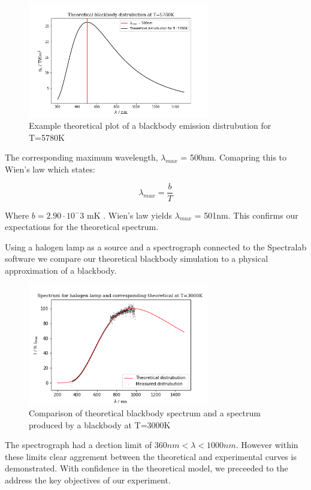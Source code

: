 \documentclass{article}%
\begin{document}
\begin{figure}[H]%
\centering%
\includegraphics[width=300px]{task1_fig_a.png}%
\caption{Example theoretical plot of a blackbody emission distrubution for T=5780K}%
\end{figure}


The corresponding maximum wavelength, $\lambda_{max}$ = 500nm. Comapring this to Wien's law which states: 

\begin{equation}
   \lambda_{max} = \frac{b}{T}
\end{equation}



Where $b=2.90 \cdot 10^-3$ mK . Wien's law yields $\lambda_{max}$ = 501nm. 
This confirms our expectations for the theoretical spectrum. 


Using a halogen lamp as a source and a spectrograph connected to the Spectralab software we compare our theoretical blackbody simulation
to a physical approximation of a blackbody. 

\begin{figure}[H]%
\centering%
\includegraphics[width=300px]{task3_fig_a.png}%
\caption{Comparison of theoretical blackbody spectrum and a spectrum produced by a blackbody at T=3000K}%
\end{figure}


The spectrograph had a dection limit of $360nm < \lambda < 1000nm$. However within these limits clear aggrement between the theoretical and experimental curves is demonstrated.
With confidence in the theoretical model, we preceeded to the address the key objectives of our experiment.
\end{document}
